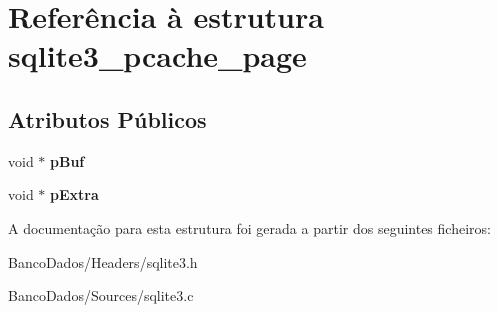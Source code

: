 \hypertarget{structsqlite3__pcache__page}{\section{Referência à estrutura sqlite3\-\_\-pcache\-\_\-page}
\label{structsqlite3__pcache__page}
}
\subsection*{Atributos Públicos}
\begin{DoxyCompactItemize}
\item 
\hypertarget{structsqlite3__pcache__page_aa5446325077c05e4b242c8e2d0faba3b}{void $\ast$ {\bfseries p\-Buf}}\label{structsqlite3__pcache__page_aa5446325077c05e4b242c8e2d0faba3b}

\item 
\hypertarget{structsqlite3__pcache__page_a96d7b0314d02837dd6a5e7057912f74f}{void $\ast$ {\bfseries p\-Extra}}\label{structsqlite3__pcache__page_a96d7b0314d02837dd6a5e7057912f74f}

\end{DoxyCompactItemize}


A documentação para esta estrutura foi gerada a partir dos seguintes ficheiros\-:\begin{DoxyCompactItemize}
\item 
Banco\-Dados/\-Headers/sqlite3.\-h\item 
Banco\-Dados/\-Sources/sqlite3.\-c\end{DoxyCompactItemize}
